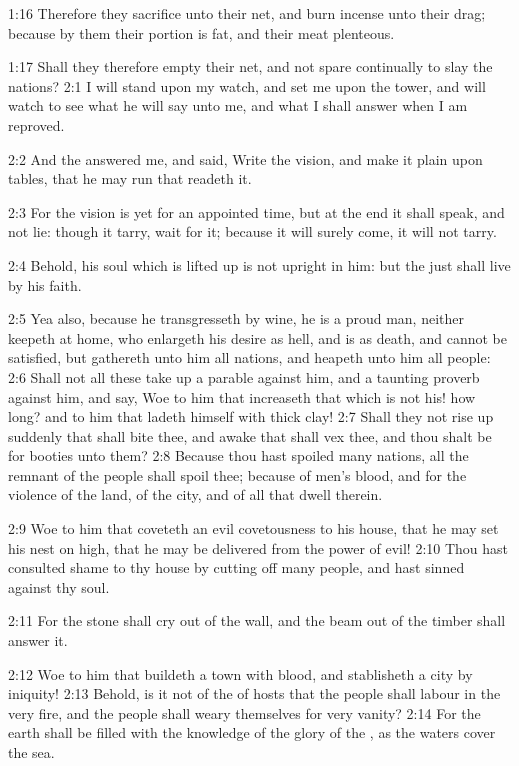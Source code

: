 1:16 Therefore they sacrifice unto their net, and burn incense unto their drag; because by them their portion is fat, and their meat plenteous.

1:17 Shall they therefore empty their net, and not spare continually to slay the nations?  2:1 I will stand upon my watch, and set me upon the tower, and will watch to see what he will say unto me, and what I shall answer when I am reproved.

2:2 And the \LORD answered me, and said, Write the vision, and make it plain upon tables, that he may run that readeth it.

2:3 For the vision is yet for an appointed time, but at the end it shall speak, and not lie: though it tarry, wait for it; because it will surely come, it will not tarry.

2:4 Behold, his soul which is lifted up is not upright in him: but the just shall live by his faith.

2:5 Yea also, because he transgresseth by wine, he is a proud man, neither keepeth at home, who enlargeth his desire as hell, and is as death, and cannot be satisfied, but gathereth unto him all nations, and heapeth unto him all people: 2:6 Shall not all these take up a parable against him, and a taunting proverb against him, and say, Woe to him that increaseth that which is not his! how long? and to him that ladeth himself with thick clay!  2:7 Shall they not rise up suddenly that shall bite thee, and awake that shall vex thee, and thou shalt be for booties unto them?  2:8 Because thou hast spoiled many nations, all the remnant of the people shall spoil thee; because of men's blood, and for the violence of the land, of the city, and of all that dwell therein.

2:9 Woe to him that coveteth an evil covetousness to his house, that he may set his nest on high, that he may be delivered from the power of evil!  2:10 Thou hast consulted shame to thy house by cutting off many people, and hast sinned against thy soul.

2:11 For the stone shall cry out of the wall, and the beam out of the timber shall answer it.

2:12 Woe to him that buildeth a town with blood, and stablisheth a city by iniquity!  2:13 Behold, is it not of the \LORD of hosts that the people shall labour in the very fire, and the people shall weary themselves for very vanity?  2:14 For the earth shall be filled with the knowledge of the glory of the \LORD, as the waters cover the sea.

